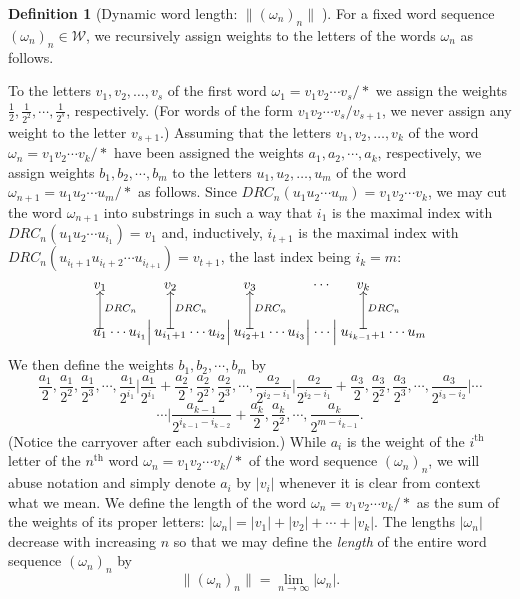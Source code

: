 \documentclass{amsart}
\theoremstyle{definition}
\newtheorem{definition}[theorem]{Definition}
\theoremstyle{remark}
\numberwithin{equation}{section}
\begin{document}
\begin{definition}[Dynamic word length: $\|(\omega_n)_n\|\;$] \label{weights} For a fixed word sequence $(\omega_n)_n\in {\mathcal W}$,
 we recursively assign weights to the letters of the words $\omega_n$ as follows.

To the letters $v_1,v_2,\ldots, v_s$ of the first word $\omega_1=v_1v_2\cdots v_s/\ast$ we assign the weights $\frac{1}{2},\frac{1}{2^2},\cdots,\frac{1}{2^s}$, respectively. (For words of the form $v_1v_2\cdots v_s/v_{s+1}$, we never assign any weight to the letter $v_{s+1}$.) Assuming that the letters $v_1,v_2,\ldots, v_k$ of the word $\omega_n=v_1v_2\cdots v_k/\ast$ have been assigned the weights $a_1,a_2,\cdots, a_k$, respectively, we assign weights $b_1, b_2, \cdots , b_m$ to the letters $u_1,u_2,\ldots, u_m$ of the word $\omega_{n+1}=u_1u_2\cdots u_m/\ast$ as follows. Since $DRC_n(u_1u_2\cdots u_m)=v_1v_2\cdots v_k$,  we may cut the word $\omega_{n+1}$ into substrings in such a way that $i_1$ is the maximal index with $DRC_n(u_1u_2\cdots u_{i_1})=v_1$ and, inductively, $i_{t+1}$ is the maximal index with $DRC_n(u_{i_t+1}u_{i_t+2}\cdots u_{i_{t+1}})=v_{t+1}$, the last index being $i_k=m$:
\[\xymatrix@1@=0pt@R=20pt{v_1& &v_2 & &v_3 & &\cdots \mbox{\hspace{1pt} } & v_k\\
u_1\ar@{|-{>}}[u]_{DRC_n}&\cdots u_{i_1}\Big|  & u_{i_1+1}\ar@{|-{>}}[u]_{DRC_n}&  \cdots u_{i_2} \Big|  & u_{i_2+1}\ar@{|-{>}}[u]_{DRC_n} & \cdots u_{i_3} \Big| &  \cdots \Big| & u_{i_{k-1}+1} \ar@{|-{>}}[u]_{DRC_n}&\cdots u_m
}
\]
We then define the weights $b_1, b_2, \cdots, b_m$ by \[\frac{a_1}{2},\frac{a_1}{2^2},\frac{a_1}{2^3}, \cdots ,\frac{a_1}{2^{i_1}}\Big| \frac{a_1}{2^{i_1}}+\frac{a_2}{2},\frac{a_2}{2^2},\frac{a_2}{2^3},\cdots, \frac{a_2}{2^{i_2-i_1}}\Big|  \frac{a_2}{2^{i_2-i_1}}+\frac{a_3}{2},\frac{a_3}{2^2},\frac{a_3}{2^3},\cdots,\frac{a_3}{2^{i_3-i_2}}\Big| \cdots \] \[\cdots \Big| \frac{a_{k-1}}{2^{i_{k-1}-i_{k-2}}}+\frac{a_k}{2},\frac{a_k}{2^2},\cdots, \frac{a_k}{2^{m-i_{k-1}}}.\]
 (Notice the carryover after each subdivision.) While $a_i$ is the weight of the $i^\text{th}$ letter of the $n^\text{th}$ word $\omega_n=v_1v_2\cdots v_k/\ast$ of the word sequence $(\omega_n)_n$, we will abuse notation and simply denote $a_i$ by $|v_i|$ whenever it is clear from context what we mean. We define the  length of the word $\omega_n=v_1v_2\cdots v_k/\ast$ as the sum of the weights of its proper letters: $|\omega_n|=|v_1|+|v_2|+\cdots +|v_k|$.  The lengths $|\omega_n|$ decrease with increasing $n$ so that we may define  the {\em length} of the entire word sequence $(\omega_n)_n$ by \[\displaystyle \|(\omega_n)_n\|=\lim_{n\rightarrow \infty} |\omega_n|.\]
\end{definition}
\end{document}
